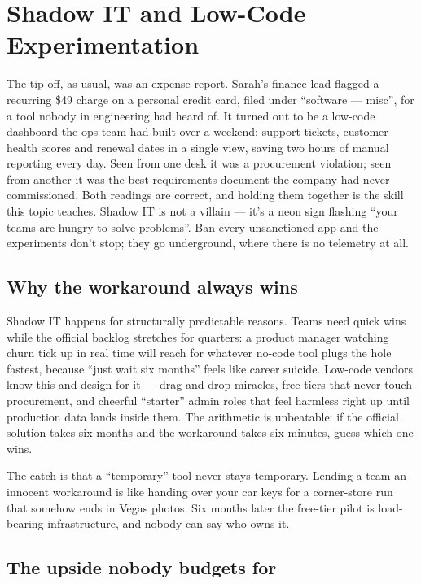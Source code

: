 \section{Shadow IT and Low-Code Experimentation}
The tip-off, as usual, was an expense report. Sarah's finance lead flagged a recurring \$49 charge on a personal credit card, filed under ``software — misc'', for a tool nobody in engineering had heard of. It turned out to be a low-code dashboard the ops team had built over a weekend: support tickets, customer health scores and renewal dates in a single view, saving two hours of manual reporting every day. Seen from one desk it was a procurement violation; seen from another it was the best requirements document the company had never commissioned. Both readings are correct, and holding them together is the skill this topic teaches. Shadow IT is not a villain — it's a neon sign flashing ``your teams are hungry to solve problems''. Ban every unsanctioned app and the experiments don't stop; they go underground, where there is no telemetry at all.



\subsection{Why the workaround always wins}


Shadow IT happens for structurally predictable reasons. Teams need quick wins while the official backlog stretches for quarters: a product manager watching churn tick up in real time will reach for whatever no-code tool plugs the hole fastest, because ``just wait six months'' feels like career suicide. Low-code vendors know this and design for it — drag-and-drop miracles, free tiers that never touch procurement, and cheerful ``starter'' admin roles that feel harmless right up until production data lands inside them. The arithmetic is unbeatable: if the official solution takes six months and the workaround takes six minutes, guess which one wins.


The catch is that a ``temporary'' tool never stays temporary. Lending a team an innocent workaround is like handing over your car keys for a corner-store run that somehow ends in Vegas photos. Six months later the free-tier pilot is load-bearing infrastructure, and nobody can say who owns it.



\subsection{The upside nobody budgets for}


